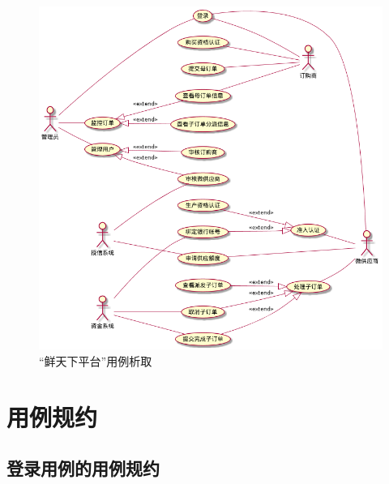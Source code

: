 \begin{figure}[htp]
    \centering
    \includegraphics[width=17cm]{figure/usecase/uc_main_ver1.png}
    \caption{“鲜天下平台”用例析取}
    \label{fig:usecase-main}
\end{figure}


\section{用例规约}

\subsection{登录用例的用例规约}

